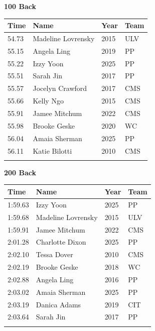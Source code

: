 \vspace{1.2em}
\noindent\begin{minipage}[t]{0.98\textwidth}
\centering
\textbf{\textcolor{teamprimary}{100 Back}}\par
\vspace{0.5em}
\centering
\small
\renewcommand{\arraystretch}{1.0}
\setlength{\tabcolsep}{4pt}
\begin{tabular}{@{}p{2.5cm}p{4.5cm}p{1.5cm}p{2.5cm}@{}}
\toprule
\textbf{Time} & \textbf{Name} & \textbf{Year} & \textbf{Team} \\
\midrule
54.73 & Madeline Lovrensky & 2015 & ULV \\
55.15 & Angela Ling & 2019 & PP \\
55.22 & Izzy Yoon & 2025 & PP \\
55.51 & Sarah Jin & 2017 & PP \\
55.57 & Jocelyn Crawford & 2017 & CMS \\
55.66 & Kelly Ngo & 2015 & CMS \\
55.91 & Jamee Mitchum & 2022 & CMS \\
55.98 & Brooke Geske & 2020 & WC \\
56.04 & Amaia Sherman & 2025 & PP \\
56.11 & Katie Bilotti & 2010 & CMS \\
\bottomrule
\vspace{0.5em}
\end{tabular}
\end{minipage}
\vspace{1.2em}
\noindent\begin{minipage}[t]{0.98\textwidth}
\centering
\textbf{\textcolor{teamprimary}{200 Back}}\par
\vspace{0.5em}
\centering
\small
\renewcommand{\arraystretch}{1.0}
\setlength{\tabcolsep}{4pt}
\begin{tabular}{@{}p{2.5cm}p{4.5cm}p{1.5cm}p{2.5cm}@{}}
\toprule
\textbf{Time} & \textbf{Name} & \textbf{Year} & \textbf{Team} \\
\midrule
1:59.63 & Izzy Yoon & 2025 & PP \\
1:59.68 & Madeline Lovrensky & 2015 & ULV \\
1:59.91 & Jamee Mitchum & 2022 & CMS \\
2:01.28 & Charlotte Dixon & 2025 & PP \\
2:02.10 & Tessa Dover & 2010 & CMS \\
2:02.19 & Brooke Geske & 2018 & WC \\
2:02.88 & Angela Ling & 2016 & PP \\
2:03.02 & Amaia Sherman & 2025 & PP \\
2:03.19 & Danica Adams & 2019 & CIT \\
2:03.64 & Sarah Jin & 2017 & PP \\
\bottomrule
\vspace{0.5em}
\end{tabular}
\end{minipage}
